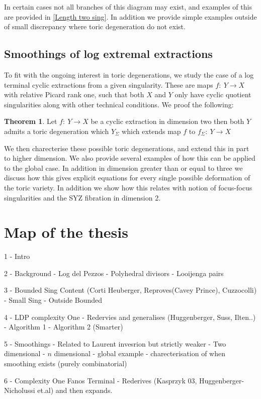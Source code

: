 \documentclass[12pt]{amsart}
\theoremstyle{definition}
\newtheorem{thm}{Theorem}[section]
\theoremstyle{definition}
\theoremstyle{definition}
\theoremstyle{definition}
\theoremstyle{definition}
\theoremstyle{definition}
\theoremstyle{definition}
\theoremstyle{definition}
\begin{document}
In certain cases not all branches of this diagram may exist, and examples of this are provided in \ref{Length two sing}. In addition we provide simple examples outside of small discrepancy where toric degeneration do not exist.

\subsection{Smoothings of log extremal extractions}

To fit with the ongoing interest in toric degenerations, we study the case of a log terminal cyclic extractions from a given singularity. These are maps $f: \: Y \rightarrow X$ with relative Picard rank one, such that both $X$ and $Y$ only have cyclic quotient singularities along with other technical conditions. We proof the following:

\begin{thm}
Let  $f: \: Y \rightarrow X$ be a cyclic extraction in dimension two then both $Y$ admits a toric degeneration which $Y_\Sigma$ which extends map $f$ to $f_\Sigma : \: Y \rightarrow X$
\end{thm}
We then charecterise these possible toric degenerations, and extend this in part to higher dimension. We also provide several examples of how this can be applied to the global case. In addition in dimension greater than or equal to three we discuss how this gives explicit equations for every single possible deformation of the toric variety. In addition we show how this relates with notion of focus-focus singularities and the SYZ fibration in dimension 2.


\section{Map of the thesis}

1 - Intro

2 - Background
	- Log del Pezzos
	- Polyhedral divisors
	- Looijenga pairs

3 - Bounded Sing Content (Corti Heuberger, Reproves(Cavey Prince), Cuzzocolli)
	- Small Sing
	- Outside Bounded

4 - LDP complexity One - Redervies and generalises (Huggenberger,  Suss, Ilten..)
	- Algorithm 1 
	- Algorithm 2 (Smarter)

5 - Smoothings - Related to Laurent invesrion but strictly weaker
	- Two dimensional
	- $n$ dimensional
	- global example
	- charecterisation of when smoothing exists (purely combinatorial)

6 - Complexity One Fanos Terminal - Rederives (Kasprzyk 03, Huggenberger-Nicholussi et.al) and then expands.
\end{document}
